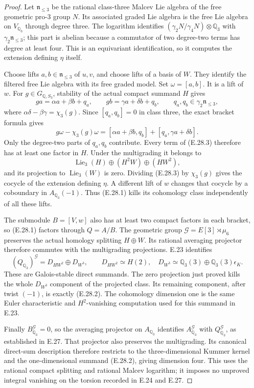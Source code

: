 \documentclass[11pt,oneside]{article}
\begin{document}
\begin{proof}
Let $\mathfrak n_{\leq3}$ be the rational class-three
Malcev Lie algebra of the free geometric pro-$3$ group
$N$. Its associated graded Lie algebra is the free Lie
algebra on $V_{\mathbb Q_3}$ through degree three.
The logarithm identifies
$(\gamma_2N/\gamma_4N)\otimes\mathbb Q_3$
with $\gamma_2\mathfrak n_{\leq3}$; this part is
abelian because a commutator of two degree-two terms
has degree at least four. This is an equivariant
identification, so it computes the extension defining
$\eta$ itself.

Choose lifts $a,b\in\mathfrak n_{\leq3}$ of $u,v$,
and choose lifts of a basis of $W$. They identify the
filtered free Lie algebra with its free graded model.
Set $\omega=[a,b]$. It is a lift of $w$. For
$g\in G_{\mathbb Q,S_3}$, stability of the actual
compact summand $H$ gives
\[
 ga=\alpha a+\beta b+q_a,
 \qquad gb=\gamma a+\delta b+q_b,
 \qquad q_a,q_b\in\gamma_2\mathfrak n_{\leq3},
\]
where $\alpha\delta-\beta\gamma=\chi_3(g)$.
Since $[q_a,q_b]=0$ in class three, the exact bracket
formula gives
\[
 g\omega-\chi_3(g)\omega
   =[\alpha a+\beta b,q_b]
       +[q_a,\gamma a+\delta b].
 \tag{E.28.3}
\]
Only the degree-two parts of $q_a,q_b$ contribute.
Every term of (E.28.3) therefore has at least one
factor in $H$. Under the multigrading it belongs to
\[
 \operatorname{Lie}_3(H)\oplus(H^2W)\oplus(HW^2),
\]
and its projection to $\operatorname{Lie}_3(W)$ is
zero. Dividing (E.28.3) by $\chi_3(g)$ gives the
cocycle of the extension defining $\eta$. A different
lift of $w$ changes that cocycle by a coboundary in
$A_{\mathbb Q_3}(-1)$. Thus (E.28.1) kills its
cohomology class independently of all these lifts.

The submodule $B=[V,w]$ also has at least two compact
factors in each bracket, so (E.28.1) factors through
$Q=A/B$. The geometric group
$\mathcal G=E[3]\rtimes\mu_6$ preserves the actual
homology splitting $H\oplus W$. Its rational
averaging projector therefore commutes with the
multigrading projections. E.23 identifies
\[
 (Q_{\mathbb Q_3})^{\mathcal G}
       =D_{HW^2}\oplus D_{W^3},
 \qquad
 D_{HW^2}\simeq H(2),
 \quad
 D_{W^3}\simeq\mathbb Q_3(3)
                     \oplus\mathbb Q_3(3)\epsilon_K.
\]
These are Galois-stable direct summands. The zero
projection just proved kills the whole $D_{W^3}$
component of the projected class. Its remaining
component, after twist $(-1)$, is exactly (E.28.2).
The cohomology dimension one is the same Euler
characteristic and $H^2$-vanishing computation used
for this summand in E.23.

Finally $B^{\mathcal G}_{\mathbb Q_3}=0$, so the
averaging projector on $A_{\mathbb Q_3}$ identifies
$A^{\mathcal G}_{\mathbb Q_3}$ with
$Q^{\mathcal G}_{\mathbb Q_3}$, as established in
E.27. That projector also preserves the multigrading.
Its canonical direct-sum description therefore
restricts to the three-dimensional Kummer kernel
and the one-dimensional summand (E.28.2), giving
dimension four. This uses the rational compact
splitting and rational Malcev logarithm; it imposes
no unproved integral vanishing on the torsion
recorded in E.24 and E.27.
\end{proof}
\end{document}
